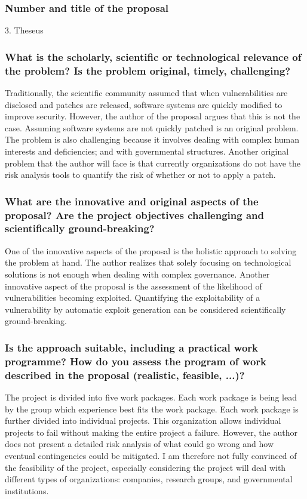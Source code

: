 \subsubsection*{Number and title of the proposal}
3. Theseus

\subsubsection*{What is the scholarly, scientific or technological relevance of the problem? Is the problem original, timely, challenging?}
Traditionally, the scientific community assumed that when vulnerabilities are disclosed and patches are released, software systems are quickly modified to improve security. However, the author of the proposal argues that this is not the case. Assuming software systems are not quickly patched is an original problem. The problem is also challenging because it involves dealing with complex human interests and deficiencies; and with governmental structures. Another original problem that the author will face is that currently organizations do not have the risk analysis tools to quantify the risk of whether or not to apply a patch.

\subsubsection*{What are the innovative and original aspects of the proposal? Are the project objectives challenging and scientifically ground-breaking?}
One of the innovative aspects of the proposal is the holistic approach to solving the problem at hand. The author realizes that solely focusing on technological solutions is not enough when dealing with complex governance. Another innovative aspect of the proposal is the assessment of the likelihood of vulnerabilities becoming exploited. Quantifying the exploitability of a vulnerability by automatic exploit generation can be considered scientifically ground-breaking.

\subsubsection*{Is the approach suitable, including a practical work programme? How do you assess the program of work described in the proposal (realistic, feasible, ...)?}
The project is divided into five work packages. Each work package is being lead by the group which experience best fits the work package. Each work package is further divided into individual projects. This organization allows individual projects to fail without making the entire project a failure. However, the author does not present a detailed risk analysis of what could go wrong and how eventual contingencies could be mitigated. I am therefore not fully convinced of the feasibility of the project, especially considering the project will deal with different types of organizations: companies, research groups, and governmental institutions.

